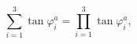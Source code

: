 \begin{equation}
\sum_{i=1}^3 \tan\varphi^a_i=\prod_{i=1}^3 \tan\varphi^a_i,   \label{EqSUSYtan}
\end{equation}

